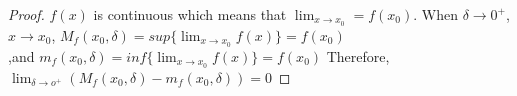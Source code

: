 \documentclass{article}
\begin{document}
            \begin{proof}
                $f(x)$ is continuous which means that $\lim_{x\rightarrow x_0}=f(x_0)$.
                When $\delta\rightarrow 0^+$, $x\rightarrow x_0$,
                $M_f(x_0,\delta)=sup\{\lim_{x\rightarrow x_0} f(x)\}=f(x_0)$\\,and $m_f(x_0,\delta)=inf\{\lim_{x\rightarrow x_0} f(x)\}=f(x_0)$
                Therefore,$\lim_{\delta\rightarrow o^+}(M_f(x_0,\delta)-m_f(x_0,\delta))=0$
            \end{proof}
\end{document}
